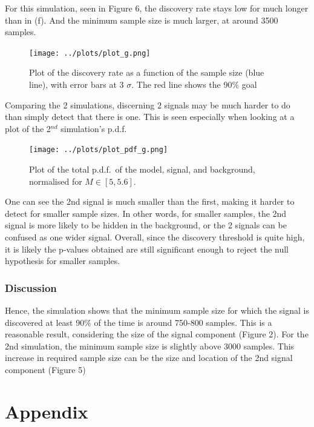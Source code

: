 \documentclass[12pt]{report} %
\begin{document}
\vspace*{1\baselineskip}
For this simulation, seen in Figure 6, the discovery rate stays low for much longer than in (f). And the minimum sample size is much larger, at around 3500 samples.

\begin{figure}[htb]
    \centering
    \texttt{[image: ../plots/plot\_g.png]}
    \captionsetup{margin=1.3cm}
    \caption[width=0.2\pdfpagewidth]{Plot of the discovery rate as a function of the sample size (blue line), with error bars at 3 $\sigma$. The red line shows the 90\% goal}
\end{figure}

\newpage
Comparing the 2 simulations, discerning 2 signals may be much harder to do than simply detect that there is one. This is seen especially when looking at a plot of the 2$^{nd}$ simulation's p.d.f.

\begin{figure}[htb]
    \centering
    \texttt{[image: ../plots/plot\_pdf\_g.png]}
    \captionsetup{margin=1.3cm}
    \caption[width=0.2\pdfpagewidth]{Plot of the total p.d.f.\ of the model, signal, and background, normalised for $M\in{[5,5.6]}$.}
\end{figure}

One can see the 2nd signal is much smaller than the first, making it harder to detect for smaller sample sizes. In other words, for smaller samples, the 2nd signal is more likely to be hidden in the background, or the 2 signals can be confused as one wider signal. Overall, since the discovery threshold is quite high, it is likely the p-values obtained are still significant enough to reject the null hypothesis for smaller samples. 
\newpage
\subsubsection*{Discussion}
Hence, the simulation shows that the minimum sample size for which the signal is discovered at least 90\% of the time is around 750-800 samples. This is a reasonable result, considering the size of the signal component (Figure 2). For the 2nd simulation, the minimum sample size is slightly above 3000 samples. This increase in required sample size can be the size and location of the 2nd signal component (Figure 5)






\section*{Appendix}
\end{document}
